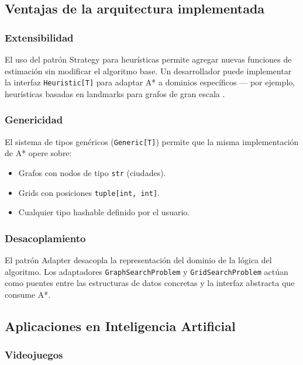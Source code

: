 \subsection{Ventajas de la arquitectura implementada}

\subsubsection{Extensibilidad}

El uso del patrón Strategy para heurísticas permite agregar nuevas funciones de estimación sin modificar el algoritmo base. Un desarrollador puede implementar la interfaz \texttt{Heuristic[T]} para adaptar A* a dominios específicos --- por ejemplo, heurísticas basadas en landmarks para grafos de gran escala \cite{goldberg2005computing}.

\subsubsection{Genericidad}

El sistema de tipos genéricos (\texttt{Generic[T]}) permite que la misma implementación de A* opere sobre:
\begin{itemize}
    \item Grafos con nodos de tipo \texttt{str} (ciudades).
    \item Grids con posiciones \texttt{tuple[int, int]}.
    \item Cualquier tipo hashable definido por el usuario.
\end{itemize}

\subsubsection{Desacoplamiento}

El patrón Adapter desacopla la representación del dominio de la lógica del algoritmo. Los adaptadores \texttt{GraphSearchProblem} y \texttt{GridSearchProblem} actúan como puentes entre las estructuras de datos concretas y la interfaz abstracta que consume A*.

\subsection{Aplicaciones en Inteligencia Artificial}

\subsubsection{Videojuegos}

